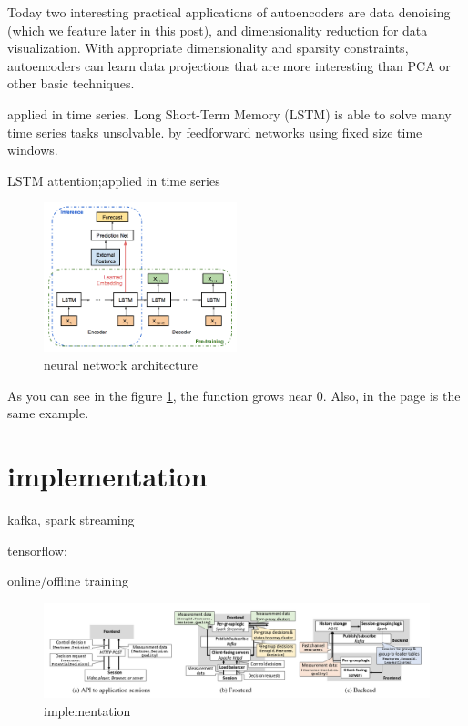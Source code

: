 \documentclass[review]{elsarticle}
\begin{document}
Today two interesting practical applications of autoencoders are data denoising (which we feature later in this post), and dimensionality reduction for data visualization. With appropriate dimensionality and sparsity constraints, autoencoders can learn data projections that are more interesting than PCA or other basic techniques. \cite{BuildingKeras}

\cite{MalhotraLongSeries} applied in time series. Long Short-Term Memory (LSTM) is able to solve many time series tasks unsolvable. by feedforward networks using fixed size time windows\cite{Gers2001ApplyingApproaches}.

LSTM attention\cite{BahdanauNEURALTRANSLATE};applied in time series \cite{CinarPosition-basedRNNs} \cite{QinAPrediction}

\begin{figure}[h]
    \centering
    \includegraphics[width=0.5\textwidth]{neural_network_architecture.png}
    \caption{neural network architecture}
    \label{fig:neural_network_architecture}
\end{figure}
As you can see in the figure \ref{fig:neural_network_architecture}, the 
function grows near 0. Also, in the page \pageref{fig:neural_network_architecture} 
is the same example.
\section{implementation}
kafka, spark streaming 

tensorflow:\cite{TensorFlow}

online/offline training
\begin{figure}[h]
    \centering
    \includegraphics[width=1\textwidth]{implementation.png}
    \caption{implementation}
    \label{fig:implementation}
\end{figure}
\end{document}
